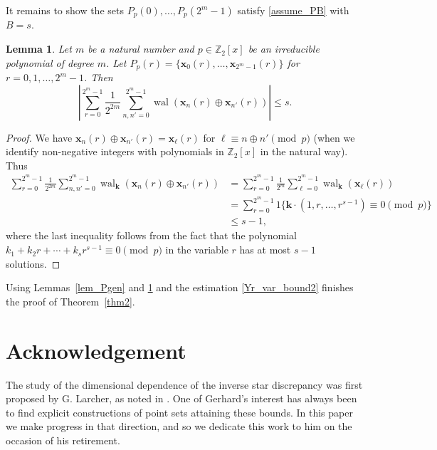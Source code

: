 \documentclass[12pt]{article}
\newtheorem{lemma}[theorem]{Lemma}
\theoremstyle{definition}
\numberwithin{equation}{section}
\begin{document}
It remains to show the sets $P_p(0), \ldots, P_p(2^m-1)$ satisfy \eqref{assume_PB} with $B = s$.
\begin{lemma}\label{lem_Kp}
Let $m$ be a natural number and $p \in \mathbb{Z}_2[x]$ be an irreducible polynomial of degree $m$. Let $P_p(r) = \{ \bm{x}_0(r), \ldots, \bm{x}_{2^m-1}(r) \}$ for $r = 0, 1, \ldots, 2^m-1$. Then
\begin{equation*}%
\left| \sum_{r=0}^{2^m-1} \frac{1}{2^{2m}} \sum_{n, n'=0}^{2^m-1} \operatorname{wal}(\bm{x}_n(r) \oplus \bm{x}_{n'}(r)) \right| \le s.
\end{equation*}
\end{lemma}


\begin{proof}
We have $\bm{x}_n(r) \oplus \bm{x}_{n'}(r) = \bm{x}_{\ell}(r)$ for $\ell \equiv n \oplus n' \pmod{p}$ (when we identify non-negative integers with polynomials in $\mathbb{Z}_2[x]$ in the natural way). Thus
\begin{align*}
\sum_{r=0}^{2^m-1} \frac{1}{2^{2m}} \sum_{n, n'=0}^{2^m-1} \operatorname{wal}_{\bm{k}}(\bm{x}_n(r) \oplus \bm{x}_{n'}(r))  & =   \sum_{r=0}^{2^m-1} \frac{1}{2^{m}} \sum_{\ell = 0}^{2^m-1} \operatorname{wal}_{\bm{k}}(\bm{x}_\ell(r) ) \\  & =   \sum_{r=0}^{2^m-1} 1\{\bm{k} \cdot (1, r, \ldots, r^{s-1}) \equiv 0 \pmod{p} \} \\ & \le s-1,
\end{align*}
where the last inequality follows from the fact that the polynomial $k_1 + k_2 r + \cdots + k_s r^{s-1} \equiv 0\pmod{p}$ in the variable $r$ has at most $s-1$ solutions.
\end{proof}

Using Lemmas~\ref{lem_Pgen} and \ref{lem_Kp} and the estimation \eqref{Yr_var_bound2} finishes the proof of Theorem~\ref{thm2}.





\section*{Acknowledgement}

The study of the dimensional dependence of the inverse star discrepancy was first proposed by G. Larcher, as noted in \cite{HNWW01}. One of Gerhard's interest has always been to find explicit constructions of point sets attaining these bounds. In this paper we make progress in that direction, and so we dedicate this work to him on the occasion of his retirement.\\
\end{document}
